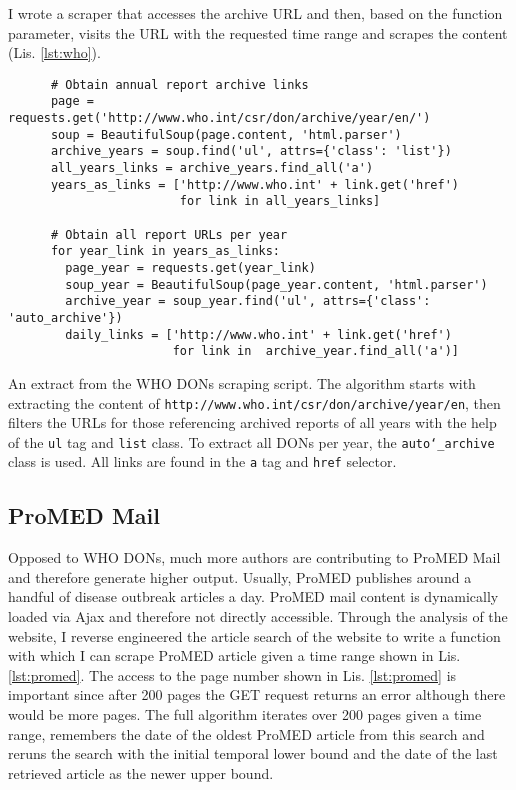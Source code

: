   I wrote a scraper that accesses the archive URL and then, based on the function parameter, visits the URL with the requested time range and scrapes the content (Lis. \ref{lst:who}).

  \begin{listing}[h]
    \begin{verbatim}
      # Obtain annual report archive links
      page = requests.get('http://www.who.int/csr/don/archive/year/en/')
      soup = BeautifulSoup(page.content, 'html.parser')
      archive_years = soup.find('ul', attrs={'class': 'list'})
      all_years_links = archive_years.find_all('a')
      years_as_links = ['http://www.who.int' + link.get('href')
                        for link in all_years_links]

      # Obtain all report URLs per year
      for year_link in years_as_links:
        page_year = requests.get(year_link)
        soup_year = BeautifulSoup(page_year.content, 'html.parser')
        archive_year = soup_year.find('ul', attrs={'class': 'auto_archive'})
        daily_links = ['http://www.who.int' + link.get('href')
                       for link in  archive_year.find_all('a')]
    \end{verbatim}
    \caption{An extract from the WHO DONs scraping script. The algorithm starts with extracting the content of \textquotesingle \texttt{http://www.who.int/csr/don/archive/year/en}\textquotesingle, then filters the URLs for those referencing archived reports of all years with the help of the \texttt{ul} tag and \texttt{list} class. To extract all DONs per year, the \texttt{auto\char`_archive} class is used. All links are found in the \texttt{a} tag and \texttt{href} selector.}
    \label{lst:who}
  \end{listing}

\subsection{ProMED Mail}
  Opposed to WHO DONs, much more authors are contributing to ProMED Mail and therefore generate higher output.
  Usually, ProMED publishes around a handful of disease outbreak articles a day.
  ProMED mail content is dynamically loaded via Ajax and therefore not directly accessible.
  Through the analysis of the website, I reverse engineered the article search of the website to write a function with which I can scrape ProMED article given a time range shown in Lis. \ref{lst:promed}.
  The access to the page number shown in Lis. \ref{lst:promed} is important since after 200 pages the GET request returns an error although there would be more pages.
  The full algorithm iterates over 200 pages given a time range, remembers the date of the oldest ProMED article from this search and reruns the search with the initial temporal lower bound and the date of the last retrieved article as the newer upper bound.

